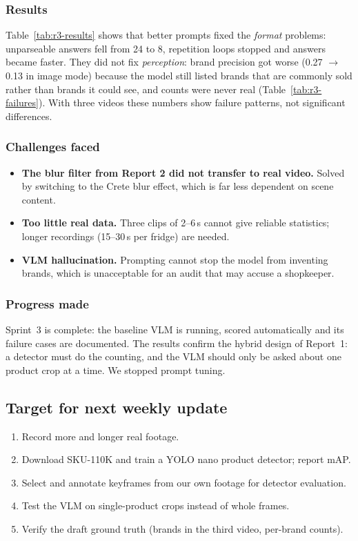 \subsubsection{Results}
Table~\ref{tab:r3-results} shows that better prompts fixed the \emph{format} problems: unparseable
answers fell from 24 to 8, repetition loops stopped and answers became faster. They did not fix
\emph{perception}: brand precision got worse (0.27 $\rightarrow$ 0.13 in image mode) because the
model still listed brands that are commonly sold rather than brands it could see, and counts were
never real (Table~\ref{tab:r3-failures}). With three videos these numbers show failure patterns,
not significant differences.

\subsubsection{Challenges faced}
\begin{itemize}
  \item \textbf{The blur filter from Report 2 did not transfer to real video.} Solved by switching
  to the Crete blur effect, which is far less dependent on scene content.
  \item \textbf{Too little real data.} Three clips of 2--6\,s cannot give reliable statistics;
  longer recordings (15--30\,s per fridge) are needed.
  \item \textbf{VLM hallucination.} Prompting cannot stop the model from inventing brands, which
  is unacceptable for an audit that may accuse a shopkeeper.
\end{itemize}

\subsubsection{Progress made}
Sprint~3 is complete: the baseline VLM is running, scored automatically and its failure cases are
documented. The results confirm the hybrid design of Report~1: a detector must do the counting, and
the VLM should only be asked about one product crop at a time. We stopped prompt tuning.

\subsection{Target for next weekly update}
\begin{enumerate}
  \item Record more and longer real footage.
  \item Download SKU-110K and train a YOLO nano product detector; report mAP.
  \item Select and annotate keyframes from our own footage for detector evaluation.
  \item Test the VLM on single-product crops instead of whole frames.
  \item Verify the draft ground truth (brands in the third video, per-brand counts).
\end{enumerate}

